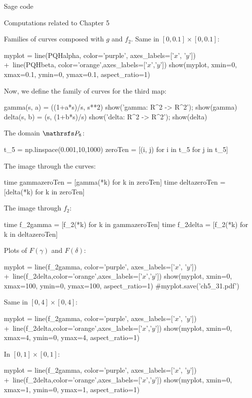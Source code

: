 \documentclass[11pt, a4paper, english, twoside, notitlepage, openright]{report}
\begin{document}
\begin{chapter}{Sage code}
\begin{section}{Computations related to Chapter 5}
\begin{subsection}{Families of curves composed with $g$ and $f_2$.}
Same in $[0,0.1]\times[0,0.1]$:
\begin{sage}
myplot = line(PQHalpha, color='purple', axes_labels=['$x$', '$y$']) +\
    line(PQHbeta, color='orange',axes_labels=['$x$','$y$'])
show(myplot, xmin=0, xmax=0.1, ymin=0, ymax=0.1, aspect_ratio=1)
\end{sage}

Now, we define the family of curves for the third map:
\begin{sage}
gamma(s, a) = ((1+a*s)/s, s**2)
show('gamma: R^2 -> R^2'); show(gamma)
delta(s, b) = (s, (1+b*s)/s)
show('delta: R^2 -> R^2'); show(delta)
\end{sage}

The domain $\PP_8$:
\begin{sage}
t_5 = np.linspace(0.001,10,1000)
zeroTen = [(i, j) for i in t_5 for j in t_5]
\end{sage}

The image through the curves:
\begin{sage}
time gammazeroTen = [gamma(*k) for k in zeroTen]
time deltazeroTen = [delta(*k) for k in zeroTen]
\end{sage}

The image through $f_2$:
\begin{sage}
time f_2gamma = [f_2(*k) for k in gammazeroTen]
time f_2delta = [f_2(*k) for k in deltazeroTen]
\end{sage}

Plots of $F(\gamma)$ and $F(\delta)$:
\begin{sage}
myplot = line(f_2gamma, color='purple', axes_labels=['$x$', '$y$']) +\
    line(f_2delta,color='orange',axes_labels=['$x$','$y$'])
show(myplot, xmin=0, xmax=100, ymin=0, ymax=100, aspect_ratio=1)
#myplot.save('ch5_31.pdf')
\end{sage}

Same in $[0,4]\times[0, 4]$:
\begin{sage}
myplot = line(f_2gamma, color='purple', axes_labels=['$x$', '$y$']) +\
    line(f_2delta,color='orange',axes_labels=['$x$','$y$'])
show(myplot, xmin=0, xmax=4, ymin=0, ymax=4, aspect_ratio=1)
\end{sage}

In $[0,1]\times[0, 1]$:
\begin{sage}
myplot = line(f_2gamma, color='purple', axes_labels=['$x$', '$y$']) +\
    line(f_2delta,color='orange',axes_labels=['$x$','$y$'])
show(myplot, xmin=0, xmax=1, ymin=0, ymax=1, aspect_ratio=1)
\end{sage}


\end{subsection}
\end{section}
\end{chapter}
\end{document}
